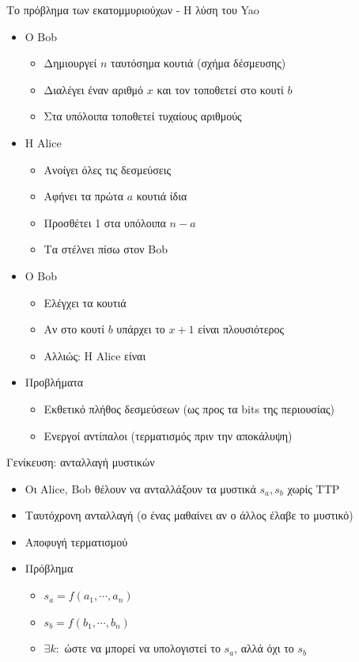 \documentclass[handout]{beamer}
\begin{document}
\begin{frame}{Το πρόβλημα των εκατομμυριούχων - Η λύση του Yao}
	\begin{itemize}
		\item Ο Bob
		\begin{itemize}
			\item Δημιουργεί $n$ ταυτόσημα κουτιά (σχήμα δέσμευσης)
			\item Διαλέγει έναν αριθμό $x$ και τον τοποθετεί στο κουτί $b$
			\item Στα υπόλοιπα τοποθετεί τυχαίους αριθμούς 
		\end{itemize} \pause 
		\item H Alice
		\begin{itemize}
			\item Ανοίγει όλες τις δεσμεύσεις
			\item Αφήνει τα πρώτα $a$ κουτιά ίδια
			\item Προσθέτει 1 στα υπόλοιπα $n-a$
			\item Τα στέλνει πίσω στον Bob
		\end{itemize} \pause 
		\item Ο Bob
		\begin{itemize}
			\item Ελέγχει τα κουτιά
			\item Αν στο κουτί $b$ υπάρχει το $x+1$ είναι πλουσιότερος
			\item Αλλιώς: Η Alice είναι
		\end{itemize} \pause 
		\item \alert{Προβλήματα} \pause 
		\begin{itemize}
			\item Εκθετικό πλήθος δεσμεύσεων (ως προς τα bits της περιουσίας)
			\item Ενεργοί αντίπαλοι (τερματισμός πριν την αποκάλυψη)
		\end{itemize}
	\end{itemize}
\end{frame}

\begin{frame}{Γενίκευση: ανταλλαγή μυστικών}
	\begin{itemize}
		\item Οι Alice, Bob θέλουν να ανταλλάξουν τα μυστικά $s_a,s_b$ χωρίς TTP
		\item Ταυτόχρονη ανταλλαγή (ο ένας μαθαίνει αν ο άλλος έλαβε το μυστικό)
		\item Αποφυγή τερματισμού 
		\item Πρόβλημα
		\begin{itemize}
			\item $s_a = f(a_1, \cdots, a_n)$
			\item $s_b = f(b_1, \cdots, b_n)$
			\item $\exists k:$ ώστε να μπορεί να υπολογιστεί το $s_a$, αλλά όχι το $s_b$
		\end{itemize}
	\end{itemize}
\end{frame}
\end{document}

